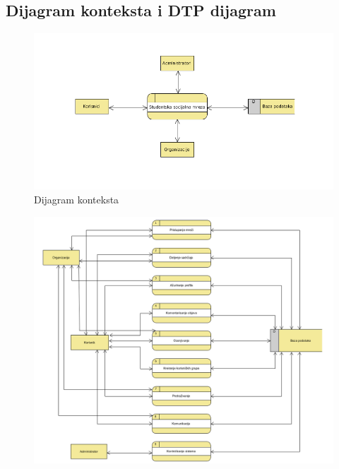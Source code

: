 \subsection{Dijagram konteksta i DTP dijagram}
\begin{figure}[h!]
    \centerline{\includegraphics[scale=0.8]{slike/dijagram_konteksta.png}}
    \caption{Dijagram konteksta}
    \label{fig:my_label}
\end{figure}

\begin{figure}[h!]
		\centerline{\includegraphics[scale=0.9]{slike/dtp.png}}
\end{figure}

\clearpage